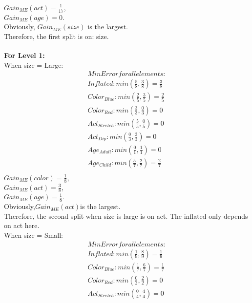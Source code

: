 \documentclass{article}
\begin{document}
\begin{enumerate}
\begin{enumerate}
            $Gain_{ME}(act)=\frac{1}{17}$,\\
            $Gain_{ME}(age)=0$.\\ 
            Obviously, $Gain_{ME}(size)$ is the largest.\\
   	    Therefore, the first split is on: size.\\\\
            \textbf{For Level 1:}\\
            When size = Large: \\
            \begin{equation*}
            \begin{split}
            MinError for all elements:\\
	Inflated: min(\frac{5}{8}, \frac{3}{8}) = \frac{3}{8}\\
	Color_{Blue}: min(\frac{2}{5}, \frac{3}{5}) = \frac{2}{5}\\
	Color_{Red}: min(\frac{3}{3}, \frac{0}{3}) = 0\\
	Act_{Stretch}: min(\frac{5}{5}, \frac{0}{5}) = 0\\
	Act_{Dip}: min(\frac{0}{3}, \frac{3}{3}) = 0\\
	Age_{Adult}: min(\frac{0}{1}, \frac{1}{1}) = 0\\
	Age_{Child}: min(\frac{5}{7}, \frac{2}{7}) = \frac{2}{7}\\
	\end{split}
	\end{equation*}
            $Gain_{ME}(color)=\frac{1}{8}$,\\
            $Gain_{ME}(act)=\frac{3}{8}$,\\
            $Gain_{ME}(age)=\frac{1}{8}$.\\
            Obviously,$Gain_{ME}(act) $is the largest.\\
            Therefore, the second split when size is large is on act. The inflated only depends on act here.\\
            When size = Small: \\
         \begin{equation*}
	\begin{split}
	MinError for all elements:\\
	Inflated: min(\frac{1}{9}, \frac{8}{9}) = \frac{1}{9}\\
	Color_{Blue}: min(\frac{1}{7}, \frac{6}{7}) = \frac{1}{7}\\
	Color_{Red}: min(\frac{0}{2}, \frac{2}{2}) = 0\\
	Act_{Stretch}: min(\frac{0}{4}, \frac{4}{4}) = 0\\

\end{split}
\end{equation*}
\end{enumerate}
\end{enumerate}
\end{document}
